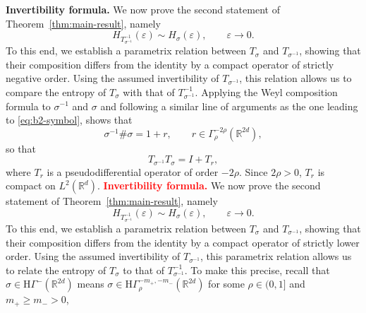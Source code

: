 \documentclass[a4paper,12pt]{article}
\newcommand{\R}{\mathbb{R}}
\newcommand{\hyponegclass}{\mathrm{H}\Gamma^-}
\begin{document}
\textbf{Invertibility formula.}
We now prove the second statement of Theorem~\ref{thm:main-result}, namely
\[
H_{T_{\sigma^{-1}}^{-1}}(\varepsilon)\sim H_\sigma(\varepsilon),
\qquad \varepsilon\to0.
\]
To this end, we establish a parametrix relation between $T_\sigma$ and
$T_{\sigma^{-1}}$, showing that their composition differs from the identity by
a compact operator of strictly negative order.
Using the assumed invertibility of $T_{\sigma^{-1}}$, this relation allows us
to compare the entropy of $T_\sigma$ with that of $T_{\sigma^{-1}}^{-1}$.
Applying the Weyl composition formula
\cite[Theorem~23.6]{shubin_pseudodifferential_2001}
to $\sigma^{-1}$ and $\sigma$ and following a similar line of arguments as the one leading to \eqref{eq:b2-symbol}, shows that
\iffalse 
\[
\sigma^{-1}\#\sigma
=
1+r,
\qquad
r\in \Gamma^{-2\rho}_\rho(\R^{2d}),
\]
so that
\[
T_{\sigma^{-1}}T_\sigma
=
I + T_r,
\]
where $T_r$ is a pseudodifferential operator of order $-2\rho$.
Since $2\rho>0$, $T_r$ is compact on $L^2(\R^d)$.
\textcolor{red}
\textbf{Invertibility formula.}
We now prove the second statement of Theorem~\ref{thm:main-result}, namely
\[
H_{T_{\sigma^{-1}}^{-1}}(\varepsilon)\sim H_\sigma(\varepsilon),
\qquad \varepsilon\to0.
\]
To this end, we establish a parametrix relation between \(T_\sigma\) and
\(T_{\sigma^{-1}}\), showing that their composition differs from the identity by
a compact operator of strictly lower order. Using the assumed invertibility of
\(T_{\sigma^{-1}}\), this parametrix relation allows us to relate the entropy of
\(T_\sigma\) to that of \(T_{\sigma^{-1}}^{-1}\).
\color{blue}
To make this precise, recall that $\sigma\in\hyponegclass(\R^{2d})$ means
$\sigma\in \mathrm{H}\Gamma^{-m_+,-m_-}_\rho(\R^{2d})$ for some
$\rho\in(0,1]$ and $m_+\ge m_->0$,
\end{document}
